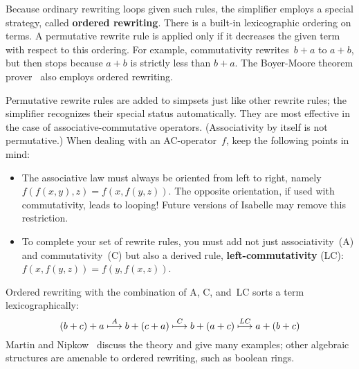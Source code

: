 Because ordinary rewriting loops given such rules, the simplifier employs a
special strategy, called {\bf ordered rewriting}.
There is a built-in lexicographic ordering on terms.  A permutative rewrite
rule is applied only if it decreases the given term with respect to this
ordering.  For example, commutativity rewrites~$b+a$ to $a+b$, but then
stops because $a+b$ is strictly less than $b+a$.  The Boyer-Moore theorem
prover~\cite{bm88book} also employs ordered rewriting.

Permutative rewrite rules are added to simpsets just like other rewrite
rules; the simplifier recognizes their special status automatically.  They
are most effective in the case of associative-commutative operators.
(Associativity by itself is not permutative.)  When dealing with an
AC-operator~$f$, keep the following points in mind:
\begin{itemize}
\item The associative law must always be oriented from left to right, namely
  $f(f(x,y),z) = f(x,f(y,z))$.  The opposite orientation, if used with
  commutativity, leads to looping!  Future versions of Isabelle may remove
  this restriction.

\item To complete your set of rewrite rules, you must add not just
  associativity~(A) and commutativity~(C) but also a derived rule, {\bf
    left-commutativity} (LC): $f(x,f(y,z)) = f(y,f(x,z))$.
\end{itemize}
Ordered rewriting with the combination of A, C, and~LC sorts a term
lexicographically:
\[\def\maps#1{\stackrel{#1}{\longmapsto}}
 (b+c)+a \maps{A} b+(c+a) \maps{C} b+(a+c) \maps{LC} a+(b+c) \]
Martin and Nipkow~\cite{martin-nipkow} discuss the theory and give many
examples; other algebraic structures are amenable to ordered rewriting,
such as boolean rings.

